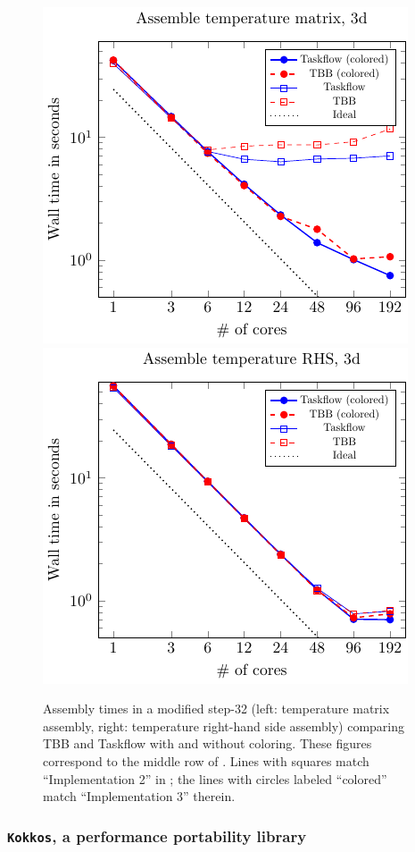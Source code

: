 \documentclass{ansarticle-preprint}
\newcommand{\specialword}[1]{\texttt{#1}}
\newcommand{\kokkos}{{\specialword{Kokkos}}\xspace}
\begin{document}
\begin{figure}[hb]
\includegraphics{taskflow-vs-tbb/plots-figure1.pdf}\hfill
\includegraphics{taskflow-vs-tbb/plots-figure2.pdf}
\caption{Assembly times in a modified step-32 (left: temperature
  matrix assembly, right: temperature right-hand side assembly)
  comparing TBB and Taskflow with and without coloring. These figures
  correspond to the middle row of \cite[Fig. 4]{TKB16}. Lines with
  squares match ``Implementation 2'' in \cite{TKB16}; the lines with
  circles labeled ``colored'' match ``Implementation 3'' therein.}
\label{fig:tbb-vs-taskflow}
\end{figure}


\subsubsection{\kokkos, a performance portability library}
\label{subsec:external-kokkos}
\end{document}
